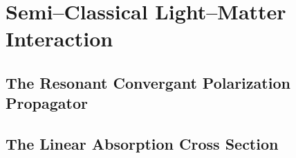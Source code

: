 \section{Semi--Classical Light--Matter Interaction}
\label{sec:SCLMI}

\subsection{The Resonant Convergant Polarization Propagator}
\label{sec:PolarProp}

\subsection{The Linear Absorption Cross Section}
\label{sec:AbsorptionTheory}
